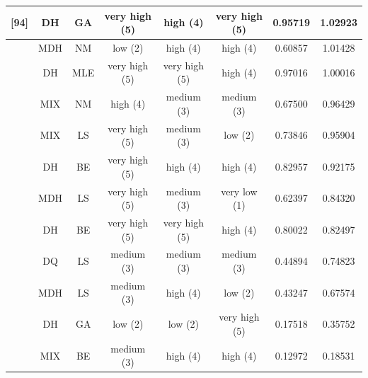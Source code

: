 \begin{tabular}{|c|c|c|c|c|c|c|c|}
[94] & DH & GA & very high (5) & high (4) & very high (5) & 0.95719 & 1.02923 \\ \hline
[80] & MDH & NM & low (2) & high (4) & high (4) & 0.60857 & 1.01428 \\ \hline
[92] & DH & MLE & very high (5) & very high (5) & high (4) & 0.97016 & 1.00016 \\ \hline
[96] & MIX & NM & high (4) & medium (3) & medium (3) & 0.67500 & 0.96429 \\ \hline
[90] & MIX & LS & very high (5) & medium (3) & low (2) & 0.73846 & 0.95904 \\ \hline
[93] & DH & BE & very high (5) & high (4) & high (4) & 0.82957 & 0.92175 \\ \hline
[110] & MDH & LS & very high (5) & medium (3) & very low (1) & 0.62397 & 0.84320 \\ \hline
[89] & DH & BE & very high (5) & very high (5) & high (4) & 0.80022 & 0.82497 \\ \hline
[14] & DQ & LS & medium (3) & medium (3) & medium (3) & 0.44894 & 0.74823 \\ \hline
[79] & MDH & LS & medium (3) & high (4) & low (2) & 0.43247 & 0.67574 \\ \hline
[122] & DH & GA & low (2) & low (2) & very high (5) & 0.17518 & 0.35752 \\ \hline
[109] & MIX & BE & medium (3) & high (4) & high (4) & 0.12972 & 0.18531 \\ \hline
\end{tabular}